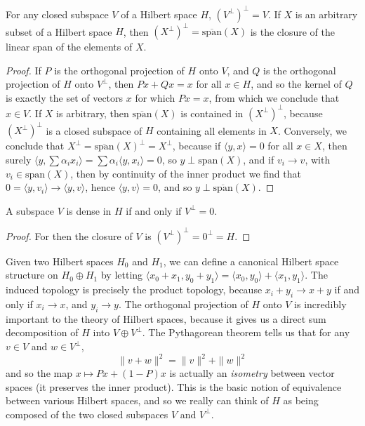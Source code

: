 \begin{corollary}
    For any closed subspace $V$ of a Hilbert space $H$, $(V^\perp)^\perp = V$. If $X$ is an arbitrary subset of a Hilbert space $H$, then $(X^\perp)^\perp = \overline{\text{span}}(X)$ is the closure of the linear span of the elements of $X$.
\end{corollary}
\begin{proof}
    If $P$ is the orthogonal projection of $H$ onto $V$, and $Q$ is the orthogonal projection of $H$ onto $V^\perp$, then $Px + Qx = x$ for all $x \in H$, and so the kernel of $Q$ is exactly the set of vectors $x$ for which $Px = x$, from which we conclude that $x \in V$. If $X$ is arbitrary, then $\overline{\text{span}}(X)$ is contained in $(X^\perp)^\perp$, because $(X^\perp)^\perp$ is a closed subspace of $H$ containing all elements in $X$. Conversely, we conclude that $X^\perp = \overline{\text{span}}(X)^\perp = X^\perp$, because if $\langle y, x \rangle = 0$ for all $x \in X$, then surely $\langle y, \sum \alpha_i x_i \rangle = \sum \alpha_i \langle y, x_i \rangle = 0$, so $y \perp \text{span}(X)$, and if $v_i \to v$, with $v_i \in \text{span}(X)$, then by continuity of the inner product we find that $0 = \langle y, v_i \rangle \to \langle y, v \rangle$, hence $\langle y, v \rangle = 0$, and so $y \perp \overline{\text{span}}(X)$.
\end{proof}

\begin{corollary}
    A subspace $V$ is dense in $H$ if and only if $V^\perp = 0$.
\end{corollary}
\begin{proof}
    For then the closure of $V$ is $(V^\perp)^\perp = 0^\perp = H$.
\end{proof}

Given two Hilbert spaces $H_0$ and $H_1$, we can define a canonical Hilbert space structure on $H_0 \oplus H_1$ by letting $\langle x_0 + x_1, y_0 + y_1 \rangle = \langle x_0, y_0 \rangle + \langle x_1, y_1 \rangle$. The induced topology is precisely the product topology, because $x_i + y_i \to x + y$ if and only if $x_i \to x$, and $y_i \to y$. The orthogonal projection of $H$ onto $V$ is incredibly important to the theory of Hilbert spaces, because it gives us a direct sum decomposition of $H$ into $V \oplus V^\perp$. The Pythagorean theorem tells us that for any $v \in V$ and $w \in V^\perp$,
%
\[ \| v + w \|^2 = \| v \|^2 + \| w \|^2 \]
%
and so the map $x \mapsto Px + (1 - P)x$ is actually an \emph{isometry} between vector spaces (it preserves the inner product). This is the basic notion of equivalence between various Hilbert spaces, and so we really can think of $H$ as being composed of the two closed subspaces $V$ and $V^\perp$.

